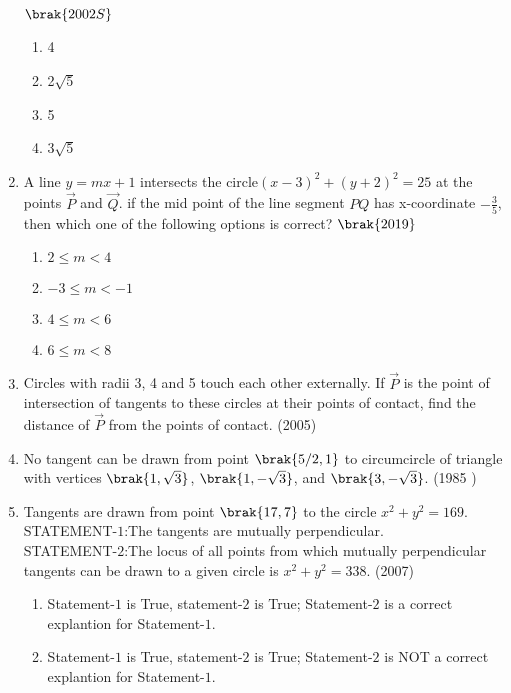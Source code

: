 \begin{enumerate}
             \hfill$\brak{2002S}$
             \begin{multicols}{2}
\begin{enumerate}
             \item 4
             \item 2$\sqrt5$
             \item 5
             \item 3$\sqrt5$
\end{enumerate}
\end{multicols}
             \item A line $y=mx+1$ intersects the circle$(x-3)^2+(y+2)^2=25$ at the points $\vec{P}$ and $\vec{Q}$. if the mid point of the line segment $PQ$ has x-coordinate $-\frac{3}{5}$,  then which one of the following options is correct?
                 \hfill$\brak{ 2019}$
                 \begin{multicols}{2}
\begin{enumerate}
                 \item $2\le m<4$
                 \item $-3\le m<-1$
                 \item $4\le m<6$
                 \item $6\le m<8$
             \end{enumerate}
\end{multicols}
\item Circles with radii 3, 4 and 5 touch each other externally. If $\vec{P}$ is the point of intersection of tangents to these circles at their points of contact,  find the distance of $\vec{P}$ from the points of contact.
	           \hfill(2005) 
    \item No tangent can be drawn from point $\brak{5/2,  1}$ to circumcircle of triangle with vertices $\brak{1,  \sqrt{3}}$,  $\brak{1,  -\sqrt{3}}$,  and $\brak{3,  -\sqrt{3}}$.
    \hfill{(1985 )}
\item Tangents are drawn from point $\brak{17,  7}$ to the circle $x^2+y^2=169$.\\
STATEMENT-$1$:The tangents are mutually perpendicular.\\
STATEMENT-$2$:The locus of all points from which mutually perpendicular tangents can be drawn to a given circle is $x^2+y^2=338$. \hfill(2007)
\begin{enumerate}
\item Statement-$1$ is True, statement-$2$ is True; Statement-$2$ is a correct explantion for Statement-$1$.
\item Statement-$1$ is True, statement-$2$ is True; Statement-$2$ is NOT a correct explantion for Statement-$1$.

\end{enumerate}
\end{enumerate}
